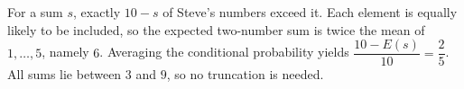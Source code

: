 For a sum $s$, exactly $10-s$ of Steve's numbers exceed it. Each element is equally likely to be included, so the expected two-number sum is twice the mean of $1,\ldots,5$, namely $6$. Averaging the conditional probability yields $\dfrac{10-E(s)}{10}=\boxed{\dfrac{2}{5}}$. All sums lie between $3$ and $9$, so no truncation is needed.

